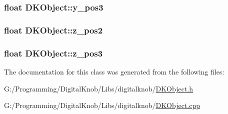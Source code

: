 \hypertarget{class_d_k_object_afd9d41620388cc15b95e33b5a1bc8c41}{
\subsubsection[{y\-\_\-pos3}]{\setlength{\rightskip}{0pt plus 5cm}float D\-K\-Object\-::y\-\_\-pos3}}\label{class_d_k_object_afd9d41620388cc15b95e33b5a1bc8c41}
\hypertarget{class_d_k_object_ac0867ee2abd58d768730f771a34ad566}{
\subsubsection[{z\-\_\-pos2}]{\setlength{\rightskip}{0pt plus 5cm}float D\-K\-Object\-::z\-\_\-pos2}}\label{class_d_k_object_ac0867ee2abd58d768730f771a34ad566}
\hypertarget{class_d_k_object_a488f47fe03a9749a7651935f70de3232}{
\subsubsection[{z\-\_\-pos3}]{\setlength{\rightskip}{0pt plus 5cm}float D\-K\-Object\-::z\-\_\-pos3}}\label{class_d_k_object_a488f47fe03a9749a7651935f70de3232}


The documentation for this class was generated from the following files\-:\begin{DoxyCompactItemize}
\item 
G\-:/\-Programming/\-Digital\-Knob/\-Libs/digitalknob/\hyperlink{_d_k_object_8h}{D\-K\-Object.\-h}\item 
G\-:/\-Programming/\-Digital\-Knob/\-Libs/digitalknob/\hyperlink{_d_k_object_8cpp}{D\-K\-Object.\-cpp}\end{DoxyCompactItemize}
